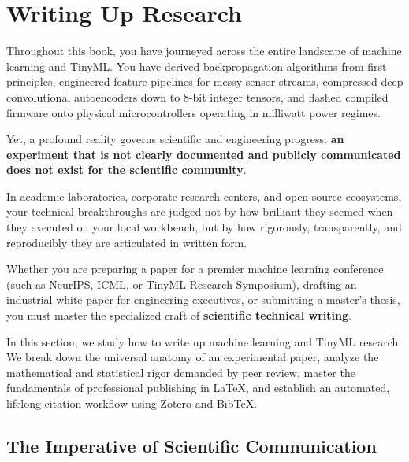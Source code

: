 \section{Writing Up Research}\label{sec:writing_research}

Throughout this book, you have journeyed across the entire landscape of machine learning and TinyML. You have derived backpropagation algorithms from first principles, engineered feature pipelines for messy sensor streams, compressed deep convolutional autoencoders down to 8-bit integer tensors, and flashed compiled firmware onto physical microcontrollers operating in milliwatt power regimes.

Yet, a profound reality governs scientific and engineering progress: \textbf{an experiment that is not clearly documented and publicly communicated does not exist for the scientific community}. 

In academic laboratories, corporate research centers, and open-source ecosystems, your technical breakthroughs are judged not by how brilliant they seemed when they executed on your local workbench, but by how rigorously, transparently, and reproducibly they are articulated in written form. 

Whether you are preparing a paper for a premier machine learning conference (such as NeurIPS, ICML, or TinyML Research Symposium), drafting an industrial white paper for engineering executives, or submitting a master's thesis, you must master the specialized craft of \textbf{scientific technical writing}.

In this section, we study how to write up machine learning and TinyML research. We break down the universal anatomy of an experimental paper, analyze the mathematical and statistical rigor demanded by peer review, master the fundamentals of professional publishing in \LaTeX{}, and establish an automated, lifelong citation workflow using Zotero and Bib\TeX{}.

\subsection{The Imperative of Scientific Communication}\label{subsec:comm_imperative}

